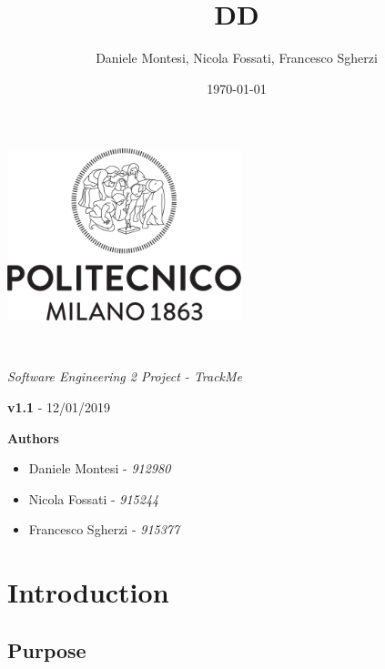 \documentclass[a4paper,oneside,11pt]{article}
\title{DD}
\author{Daniele Montesi, Nicola Fossati, Francesco Sgherzi}
\date{\today}
\begin{document}
    \begin{titlingpage} 
        \begin{center}
            \includegraphics[height=5cm]{assets/Logo_Politecnico_Milano.png}\\
            \vspace{4cm}
            \begin{huge} 
                \textbf{\thetitle} \\
            \end{huge}
            \vspace{0.3cm}
                    \begin{Large}
                \textit{Software Engineering 2 Project - TrackMe} \\
            \end{Large}
        \end{center}
         \textbf{v1.1} - 12/01/2019 \\

            \vspace{4cm}
             \begin{large}
            \textbf{Authors}
            \begin{itemize}
                \item Daniele Montesi - \textit{912980} 
                \item Nicola Fossati - \textit{915244}
                \item Francesco Sgherzi - \textit{915377}
            \end{itemize}
        \end{large}
    \end{titlingpage}
    \newpage
    \tableofcontents
    \newpage
    \section{Introduction}
    
        \subsection{Purpose}
            
\end{document}
